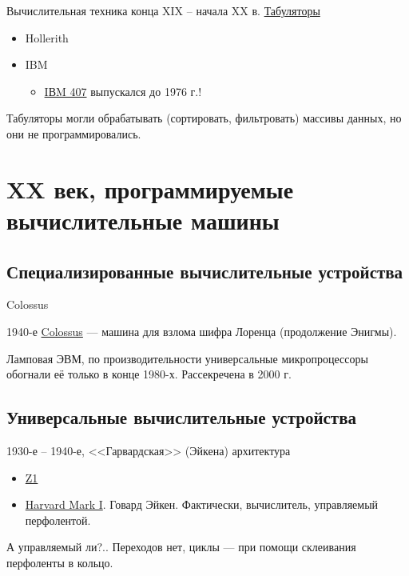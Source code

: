 \documentclass[xetex,aspectratio=43]{beamer}
\begin{document}
\begin{frame}{Вычислительная техника конца XIX -- начала XX в.}
	\href{https://en.wikipedia.org/wiki/Tabulating_machine}{Табуляторы}

	\begin{itemize}
		\item
		Hollerith
		\item
		IBM

		\begin{itemize}
			\item
			\href{https://en.wikipedia.org/wiki/IBM_407}{IВM 407} выпускался до
			1976 г.!
		\end{itemize}
	\end{itemize}

	Табуляторы могли обрабатывать (сортировать, фильтровать) массивы данных,
	но они не программировались.
\end{frame}

\section{XX век, программируемые вычислительные машины}

\subsection{Специализированные вычислительные устройства}

\begin{frame}{Colossus}

		1940-е \href{https://en.wikipedia.org/wiki/Colossus_computer}{Colossus}
		--- машина для взлома шифра Лоренца (продолжение Энигмы).

		Ламповая ЭВМ, по производительности универсальные микропроцессоры
		обогнали её только в конце 1980-х. Рассекречена в 2000 г.

\end{frame}

\subsection{Универсальные вычислительные устройства}

\begin{frame}{1930-е -- 1940-е, <<Гарвардская>> (Эйкена) архитектура}
		\begin{itemize}
			\item
			\href{https://en.wikipedia.org/wiki/Z1_(computer)}{Z1}
		\pause
			\item
			\href{https://en.wikipedia.org/wiki/Harvard_Mark_I}{Harvard Mark I}.
			Говард Эйкен. Фактически, вычислитель, управляемый перфолентой.
		\end{itemize}

		\begin{figure}
			
		\end{figure}

		\pause
		А управляемый ли?.. Переходов нет, циклы --- при помощи склеивания перфоленты в кольцо.
\end{frame}
\end{document}
